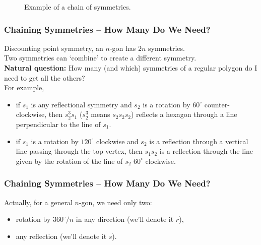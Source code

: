 \documentclass[aspectratio=169,11pt,svgnames,handout]{beamer}
\begin{document}
\begin{frame}
\begin{figure}[H]
\begin{subfigure}[b]{\textwidth}
  \end{subfigure}
  \caption*{Example of a chain of symmetries.}
 \end{figure}
\end{frame}

\begin{frame}
 \frametitle{Chaining Symmetries -- How Many Do We Need?}
 Discounting point symmetry, an $n$-gon has \alert{$2n$} symmetries.\\
 \pause
 Two symmetries can `combine' to create a different symmetry.\\
 \pause
 \textbf{Natural question:} How many (and which) symmetries of a regular polygon
  do I need to get all the others?\\
  \pause
  For example,
  \begin{itemize}[label=\textbullet,topsep=0pt]
   \item if $s_1$ is any reflectional symmetry and $s_2$ is a rotation by $60^{
    \circ }$ counter-clockwise, then $s_2^3s_1$ ($s_2^3$ means $s_2s_2s_2$)
    reflects a hexagon through a line perpendicular to the line of $s_1$.
   \pause
   \item if $s_1$ is a rotation by $120^{ \circ }$ clockwise and $s_2$ is a
    reflection through a vertical line passing through the top vertex, then
    $s_1s_2$ is a reflection through the line given by the rotation of the line
    of $s_2$ $60^{ \circ }$ clockwise.
  \end{itemize}
\end{frame}

\begin{frame}
 \frametitle{Chaining Symmetries -- How Many Do We Need?}
 Actually, for a general $n$-gon, we need only \alert{two}:
 \pause
 \begin{itemize}[label=\textbullet,topsep=0pt]
  \item rotation by $360^{ \circ } / n$ in any direction (we'll denote it $r$),
  \pause
  \item any reflection (we'll denote it $s$).
 \end{itemize}
\end{frame}
\end{document}
